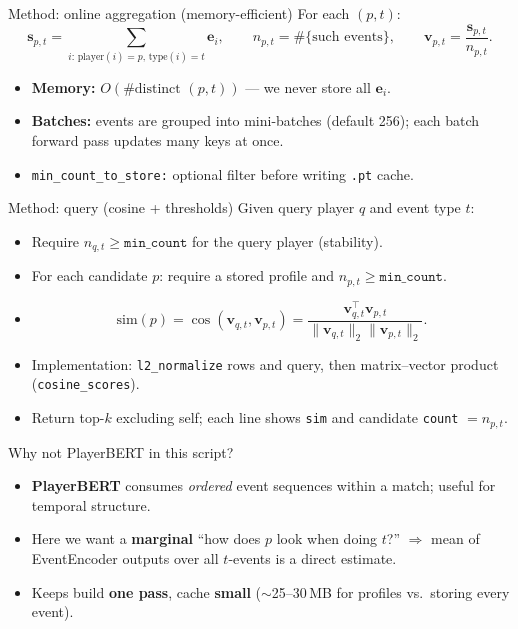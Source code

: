 \documentclass[aspectratio=169]{beamer}
\begin{document}
\begin{frame}{Method: online aggregation (memory-efficient)}
  For each $(p,t)$:
  \[
    \mathbf{s}_{p,t} = \sum_{i:\, \text{player}(i)=p,\, \text{type}(i)=t} \mathbf{e}_i,
    \qquad
    n_{p,t} = \#\{\text{such events}\},
    \qquad
    \mathbf{v}_{p,t} = \frac{\mathbf{s}_{p,t}}{n_{p,t}}.
  \]
  \begin{itemize}
    \item \textbf{Memory:} $O(\#\text{distinct }(p,t))$ --- we never store all $\mathbf{e}_i$.
    \item \textbf{Batches:} events are grouped into mini-batches (default 256); each batch forward pass updates many keys at once.
    \item \texttt{min\_count\_to\_store:} optional filter before writing \texttt{.pt} cache.
  \end{itemize}
\end{frame}

\begin{frame}{Method: query (cosine + thresholds)}
  Given query player $q$ and event type $t$:
  \begin{itemize}
    \item Require $n_{q,t} \geq \texttt{min\_count}$ for the query player (stability).
    \item For each candidate $p$: require a stored profile and $n_{p,t} \geq \texttt{min\_count}$.
    \item
    \[
      \mathrm{sim}(p) = \cos(\mathbf{v}_{q,t}, \mathbf{v}_{p,t})
      = \frac{\mathbf{v}_{q,t}^\top \mathbf{v}_{p,t}}{\lVert \mathbf{v}_{q,t}\rVert_2 \lVert \mathbf{v}_{p,t}\rVert_2}.
    \]
    \item Implementation: \texttt{l2\_normalize} rows and query, then matrix--vector product (\texttt{cosine\_scores}).
    \item Return top-$k$ excluding self; each line shows \texttt{sim} and candidate \texttt{count} $= n_{p,t}$.
  \end{itemize}
\end{frame}

\begin{frame}{Why not PlayerBERT in this script?}
  \begin{itemize}
    \item \textbf{PlayerBERT} consumes \emph{ordered} event sequences within a match; useful for temporal structure.
    \item Here we want a \textbf{marginal} ``how does $p$ look when doing $t$?'' $\Rightarrow$ mean of EventEncoder outputs over all $t$-events is a direct estimate.
    \item Keeps build \textbf{one pass}, cache \textbf{small} ($\sim$25--30\,MB for profiles vs.\ storing every event).
  \end{itemize}
\end{frame}
\end{document}
